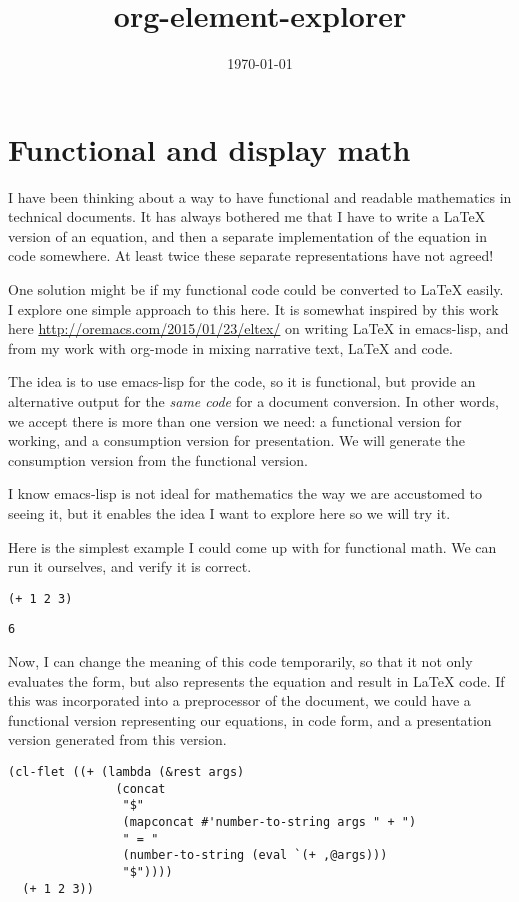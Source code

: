 \documentclass[11pt]{article}
\date{\today}
\title{org-element-explorer}
\begin{document}
\section{Functional and display math}
\label{sec-1}
I have been thinking about a way to have functional and readable mathematics in technical documents. It has always bothered me that I have to write a \LaTeX{} version of an equation, and then a separate implementation of the equation in code somewhere. At least twice these separate representations have not agreed!

One solution might be if my functional code could be converted to \LaTeX{} easily. I explore one simple approach to this here. It is somewhat inspired by this work here \url{http://oremacs.com/2015/01/23/eltex/} on writing \LaTeX{} in emacs-lisp, and from my work with org-mode in mixing narrative text, \LaTeX{} and code.

The idea is to use emacs-lisp for the code, so it is functional, but provide an alternative output for the \emph{same code} for a document conversion. In other words, we accept there is more than one version we need: a functional version for working, and a consumption version for presentation. We will generate the consumption version from the functional version.

I know emacs-lisp is not ideal for mathematics the way we are accustomed to seeing it, but it enables the idea I want to explore here so we will try it.

Here is the simplest example I could come up with for functional math. We can run it ourselves, and verify it is correct.

\begin{verbatim}
(+ 1 2 3)
\end{verbatim}

\begin{verbatim}
6
\end{verbatim}

Now, I can change the meaning of this code temporarily, so that it not only evaluates the form, but also represents the equation and result in \LaTeX{} code. If this was incorporated into a preprocessor of the document, we could have a functional version representing our equations, in code form, and a presentation version generated from this version.

\begin{verbatim}
(cl-flet ((+ (lambda (&rest args)
               (concat
                "$"
                (mapconcat #'number-to-string args " + ")
                " = "
                (number-to-string (eval `(+ ,@args)))
                "$"))))
  (+ 1 2 3))
\end{verbatim}
\end{document}
